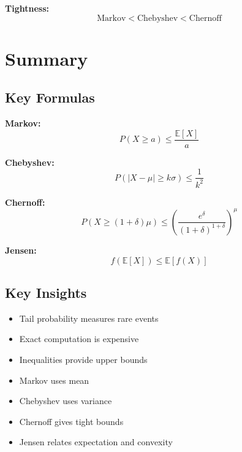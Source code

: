 \documentclass[12pt]{article}
\begin{document}
\textbf{Tightness:}
\[
\text{Markov} < \text{Chebyshev} < \text{Chernoff}
\]

\section{Summary}

\subsection{Key Formulas}

\textbf{Markov:}
\[
P(X \ge a) \le \frac{\mathbb{E}[X]}{a}
\]

\textbf{Chebyshev:}
\[
P(|X - \mu| \ge k\sigma) \le \frac{1}{k^2}
\]

\textbf{Chernoff:}
\[
P(X \ge (1+\delta)\mu) \le \left(\frac{e^\delta}{(1+\delta)^{1+\delta}}\right)^\mu
\]

\textbf{Jensen:}
\[
f(\mathbb{E}[X]) \le \mathbb{E}[f(X)]
\]

\subsection{Key Insights}

\begin{itemize}
\item Tail probability measures rare events
\item Exact computation is expensive
\item Inequalities provide upper bounds
\item Markov uses mean
\item Chebyshev uses variance
\item Chernoff gives tight bounds
\item Jensen relates expectation and convexity
\end{itemize}
\end{document}
